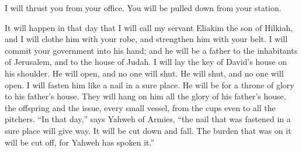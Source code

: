 {I will thrust you from your office. You will be pulled down from your station.
\par }{\PP {}It will happen in that day that I will call my servant Eliakim the son of Hilkiah,
and I will clothe him with your robe, and strengthen him with your belt. I will commit your government into his hand; and he will be a father to the inhabitants of Jerusalem, and to the house of Judah.
I will lay the key of David’s house on his shoulder. He will open, and no one will shut. He will shut, and no one will open.
I will fasten him like a nail in a sure place. He will be for a throne of glory to his father’s house.
They will hang on him all the glory of his father’s house, the offspring and the issue, every small vessel, from the cups even to all the pitchers.
“In that day,” says Yahweh of Armies, “the nail that was fastened in a sure place will give way. It will be cut down and fall. The burden that was on it will be cut off, for Yahweh has spoken it.”

}
